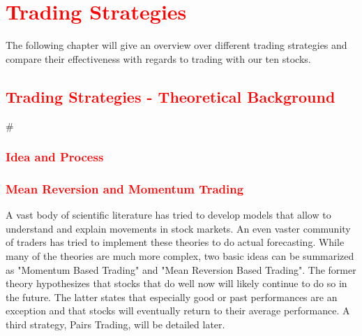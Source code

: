 \chapter{\textcolor{red}{Trading Strategies}}\label{ch:predictions}
The following chapter will give an overview over different trading strategies and compare their effectiveness with regards to trading with our ten stocks. %


\section{\textcolor{red}{Trading Strategies - Theoretical Background}}
#\subsection{\textcolor{red}{Idea and Process}}

\subsection{\textcolor{red}{Mean Reversion and Momentum Trading}}
A vast body of scientific literature has tried to develop models that allow to understand and explain movements in stock markets. An even vaster community of traders has tried to implement these theories to do actual forecasting. While many of the theories are much more complex, two basic ideas can be summarized as "Momentum Based Trading" and "Mean Reversion Based Trading". The former theory hypothesizes that stocks that do well now will likely continue to do so in the future. The latter states that especially good or past performances are an exception and that stocks will eventually return to their average performance. A third strategy, Pairs Trading, will be detailed later. 

